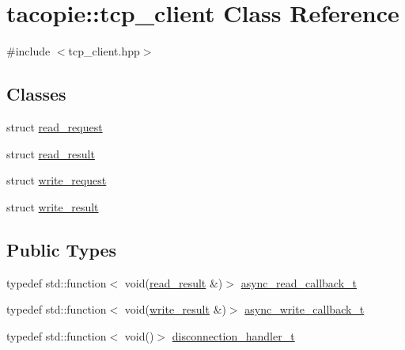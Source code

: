 \hypertarget{classtacopie_1_1tcp__client}{}\section{tacopie\+:\+:tcp\+\_\+client Class Reference}
\label{classtacopie_1_1tcp__client}


{\ttfamily \#include $<$tcp\+\_\+client.\+hpp$>$}

\subsection*{Classes}
\begin{DoxyCompactItemize}
\item 
struct \hyperlink{structtacopie_1_1tcp__client_1_1read__request}{read\+\_\+request}
\item 
struct \hyperlink{structtacopie_1_1tcp__client_1_1read__result}{read\+\_\+result}
\item 
struct \hyperlink{structtacopie_1_1tcp__client_1_1write__request}{write\+\_\+request}
\item 
struct \hyperlink{structtacopie_1_1tcp__client_1_1write__result}{write\+\_\+result}
\end{DoxyCompactItemize}
\subsection*{Public Types}
\begin{DoxyCompactItemize}
\item 
typedef std\+::function$<$ void(\hyperlink{structtacopie_1_1tcp__client_1_1read__result}{read\+\_\+result} \&)$>$ \hyperlink{classtacopie_1_1tcp__client_acdf9dea8bac6c56f7b04ce38b9432322}{async\+\_\+read\+\_\+callback\+\_\+t}
\item 
typedef std\+::function$<$ void(\hyperlink{structtacopie_1_1tcp__client_1_1write__result}{write\+\_\+result} \&)$>$ \hyperlink{classtacopie_1_1tcp__client_ad48b8c8dff8a77490eb2e3e802c82b97}{async\+\_\+write\+\_\+callback\+\_\+t}
\item 
typedef std\+::function$<$ void()$>$ \hyperlink{classtacopie_1_1tcp__client_aca5df52e5ee6fa673cf212532ada1453}{disconnection\+\_\+handler\+\_\+t}
\end{DoxyCompactItemize}
